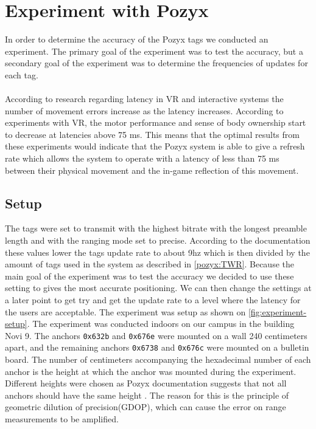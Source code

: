 \section{Experiment with Pozyx}
In order to determine the accuracy of the Pozyx tags we conducted an experiment.
The primary goal of the experiment was to test the accuracy, but a secondary goal of the experiment was to determine the frequencies of updates for each tag.
\\\\
According to research regarding latency in VR \cite{WaltemateThomas2016Tiol} and interactive systems \cite{10.1145/169059.169431} the number of movement errors increase as the latency increases.
According to experiments with VR, the motor performance and sense of body ownership start to decrease at latencies above 75 ms.
This means that the optimal results from these experiments would indicate that the Pozyx system is able to give a refresh rate which allows the system to operate with a latency of less than 75 ms between their physical movement and the in-game reflection of this movement.

\subsection{Setup}
The tags were set to transmit with the highest bitrate with the longest preamble length and with the ranging mode set to precise\cite{pozyx-Performance}.
According to the documentation these values lower the tags update rate to about 9hz which is then divided by the amount of tags used in the system as described in \ref{pozyx:TWR}.
Because the main goal of the experiment was to test the accuracy we decided to use these setting to gives the most accurate positioning.
We can then change the settings at a later point to get try and get the update rate to a level where the latency for the users are acceptable.
The experiment was setup as shown on \autoref{fig:experiment-setup}. 
The experiment was conducted indoors on our campus in the building Novi 9. 
The anchors \texttt{0x632b} and \texttt{0x676e} were mounted on a wall 240 centimeters apart, and the remaining anchors \texttt{0x6738} and \texttt{0x676c} were mounted on a bulletin board.
The number of centimeters accompanying the hexadecimal number of each anchor is the height at which the anchor was mounted during the experiment.
Different heights were chosen as Pozyx documentation suggests that not all anchors should have the same height \cite{pozyx-AnchorHeights}.
The reason for this is the principle of geometric dilution of precision(GDOP), which can cause the error on range measurements to be amplified.

